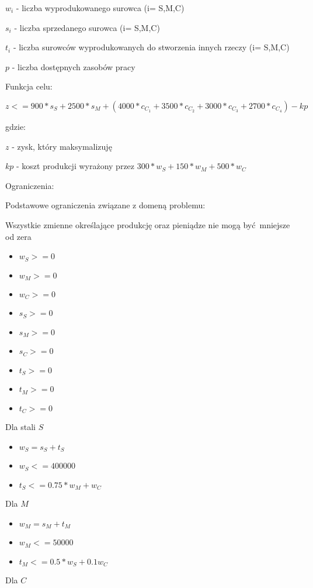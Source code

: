 \documentclass{article}
\begin{document}
$w_i$ - liczba wyprodukowanego surowca (i= S,M,C)

$s_i$ - liczba sprzedanego surowca (i= S,M,C)

$t_i$ - liczba surowców wyprodukowanych do stworzenia innych rzeczy (i= S,M,C)

$p$ - liczba dostępnych zasobów pracy

\noindent
Funkcja celu:

$z <= 900 * s_S + 2500 * s_M + (4000 * c_C_1 + 3500 * c_C_2 + 3000 * c_C_3 + 2700 * c_C_4) - kp$

gdzie:

$z$ - zysk, który maksymalizuję

$kp$ - koszt produkcji wyrażony przez $300 * w_S + 150 * w_M + 500 * w_C$

\noindent
Ograniczenia:

Podstawowe ograniczenia związane z domeną problemu:

Wszystkie zmienne określające produkcję oraz pieniądze nie mogą być mniejsze od zera

\begin{itemize}
  \item $w_S >= 0$
  \item $w_M >= 0$
  \item $w_C >= 0$
  \item $s_S >= 0$
  \item $s_M >= 0$
  \item $s_C >= 0$
  \item $t_S >= 0$
  \item $t_M >= 0$
  \item $t_C >= 0$
\end{itemize}

Dla stali $S$

\begin{itemize}
  \item $w_S = s_S + t_S$
  \item $w_S <= 400000$
  \item $t_S <= 0.75 * w_M + w_C$
\end{itemize}

Dla $M$

\begin{itemize}
  \item $w_M = s_M + t_M$
  \item $w_M <= 50000$
  \item $t_M <= 0.5 * w_S + 0.1 w_C$
\end{itemize}

Dla $C$
\end{document}
